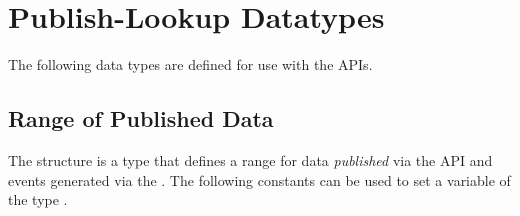 \section{Publish-Lookup Datatypes}

The following data types are defined for use with the  \acp{API}.

\subsection{Range of Published Data}

The  structure is a  type that defines a range for data \textit{published} via the  \ac{API} and events generated via the .
The following constants can be used to set a variable of the type .

